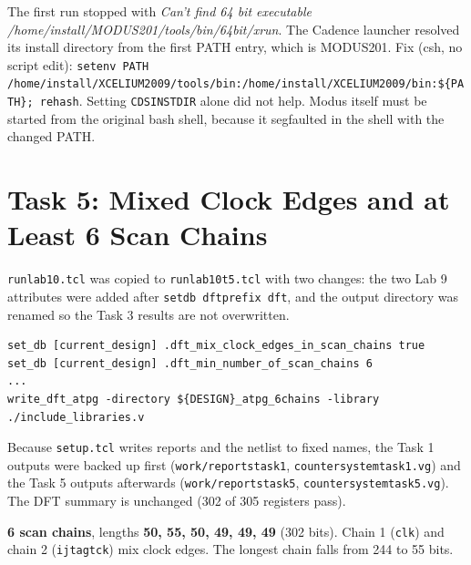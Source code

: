 \documentclass[11pt]{article}
\renewcommand{\_}{\oldus\hspace{0pt}}
\newcommand{\code}[1]{\texttt{\small #1}}
\begin{document}
\begin{probbox}
The first run stopped with \emph{Can't find 64 bit executable /home/install/MODUS201/tools/bin/64bit/xrun}. The Cadence launcher
resolved its install directory from the first PATH entry, which is MODUS201. Fix (csh, no script edit):
\code{setenv PATH /home/install/XCELIUM2009/tools/bin:/home/install/XCELIUM2009/bin:\$\{PATH\}; rehash}. Setting
\code{CDS\_INST\_DIR} alone did not help. Modus itself must be started from the original bash shell, because it
segfaulted in the shell with the changed PATH.
\end{probbox}

\section{Task 5: Mixed Clock Edges and at Least 6 Scan Chains}

\code{run\_lab10.tcl} was copied to \code{run\_lab10\_t5.tcl} with two changes: the two Lab 9 attributes were added after
\code{set\_db dft\_prefix dft\_}, and the output directory was renamed so the Task 3 results are not overwritten.

\begin{lstlisting}
set_db [current_design] .dft_mix_clock_edges_in_scan_chains true
set_db [current_design] .dft_min_number_of_scan_chains 6
...
write_dft_atpg -directory ${DESIGN}_atpg_6chains -library ./include_libraries.v
\end{lstlisting}

Because \code{setup.tcl} writes reports and the netlist to fixed names, the Task 1 outputs were backed up first
(\code{work/reports\_task1}, \code{counter\_system\_task1.vg}) and the Task 5 outputs afterwards (\code{work/reports\_task5},
\code{counter\_system\_task5.vg}). The DFT summary is unchanged (302 of 305 registers pass).

\begin{resultbox}
\textbf{6 scan chains}, lengths \textbf{50, 55, 50, 49, 49, 49} (302 bits). Chain 1 (\code{clk}) and chain 2 (\code{ijtag\_tck}) mix clock
edges. The longest chain falls from 244 to 55 bits.
\end{resultbox}
\end{document}
